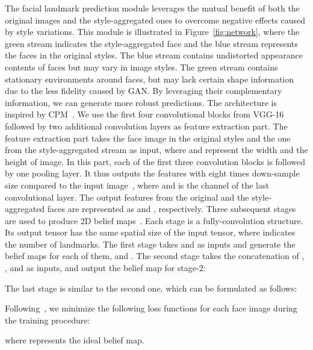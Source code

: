 \documentclass[10pt,twocolumn,letterpaper]{article}
\begin{document}
The facial landmark prediction module leverages the mutual benefit of both the original images and the style-aggregated ones to overcome negative effects caused by style variations.
This module is illustrated in Figure~\ref{fig:network}, where the green stream indicates the style-aggregated face and the blue stream represents the faces in the original styles.
The blue stream contains undistorted appearance contents of faces but may vary in image styles.
The green stream contains stationary environments around faces, but may lack certain shape information due to the less fidelity caused by GAN.
By leveraging their complementary information, we can generate more robust predictions. 
The architecture is inspired by CPM~\cite{wei2016convolutional}.
We use the first four convolutional blocks from VGG-16~\cite{simonyan2015very} followed by two additional convolution layers as feature extraction part.
The feature extraction part takes the face image  in the original styles and the one  from the style-aggregated stream as input, where  and  represent the width and the height of image.
In this part, each of the first three convolution blocks is followed by one pooling layer.
It thus outputs the features  with eight times down-sample size compared to the input image~, where  and  is the channel of the last convolutional layer.
The output features from the original and the style-aggregated faces are represented as  and , respectively.
Three subsequent stages are used to produce 2D belief maps~\cite{wei2016convolutional}.
Each stage is a fully-convolution structure.
Its output tensor  has the same spatial size of the input tensor, where  indicates the number of landmarks.
The first stage takes  and  as inputs and generate the belief maps for each of them,  and .
The second stage  takes the concatenation of , ,  and  as inputs, and output the belief map for stage-2:
{

}
\vspace{-5mm}

\noindent The last stage is similar to the second one, which can be formulated as follows:
{

}
\vspace{-5mm}

\noindent Following~\cite{newell2016stacked,wei2016convolutional}, we minimize the following loss functions for each face image during the training procedure:
{

}
\vspace{-3mm}

\noindent where  represents the ideal belief map.
\end{document}
